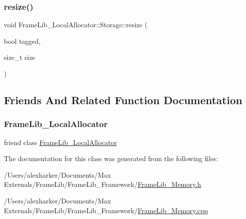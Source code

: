 \mbox{\label{class_frame_lib___local_allocator_1_1_storage_a3b432eda27a1cd4ca6fce89015c60c75}} 
\subsubsection{\texorpdfstring{resize()}{resize()}}
{\footnotesize\ttfamily void Frame\+Lib\+\_\+\+Local\+Allocator\+::\+Storage\+::resize (\begin{DoxyParamCaption}\item[{bool}]{tagged,  }\item[{size\+\_\+t}]{size }\end{DoxyParamCaption})\hspace{0.3cm}{\ttfamily [protected]}}



\subsection{Friends And Related Function Documentation}
\mbox{\label{class_frame_lib___local_allocator_1_1_storage_ab38ae86a5b2f6f2e79c8b7ed2a9c8c20}} 
\subsubsection{\texorpdfstring{Frame\+Lib\+\_\+\+Local\+Allocator}{FrameLib\_LocalAllocator}}
{\footnotesize\ttfamily friend class \hyperlink{class_frame_lib___local_allocator}{Frame\+Lib\+\_\+\+Local\+Allocator}\hspace{0.3cm}{\ttfamily [friend]}}



The documentation for this class was generated from the following files\+:\begin{DoxyCompactItemize}
\item 
/\+Users/alexharker/\+Documents/\+Max Externals/\+Frame\+Lib/\+Frame\+Lib\+\_\+\+Framework/\hyperlink{_frame_lib___memory_8h}{Frame\+Lib\+\_\+\+Memory.\+h}\item 
/\+Users/alexharker/\+Documents/\+Max Externals/\+Frame\+Lib/\+Frame\+Lib\+\_\+\+Framework/\hyperlink{_frame_lib___memory_8cpp}{Frame\+Lib\+\_\+\+Memory.\+cpp}\end{DoxyCompactItemize}

